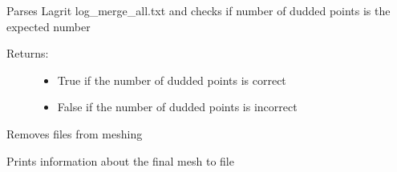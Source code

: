 \documentclass[letterpaper,10pt,english]{sphinxmanual}
\begin{document}
\begin{fulllineitems}
\label{pydfnworks:pydfnworks.mesh_dfn_helper.check_dudded_points}
Parses Lagrit log\_merge\_all.txt and checks if number of dudded points
is the expected number
\begin{description}
\item[{Returns: }] \leavevmode\begin{itemize}
\item {} 
True if the number of dudded points is correct

\item {} 
False if the number of dudded points is incorrect

\end{itemize}

\end{description}

\end{fulllineitems}


\begin{fulllineitems}
\label{pydfnworks:pydfnworks.mesh_dfn_helper.cleanup_dir}
Removes files from meshing

\end{fulllineitems}


\begin{fulllineitems}
\label{pydfnworks:pydfnworks.mesh_dfn_helper.output_meshing_report}
Prints information about the final mesh to file

\end{fulllineitems}

\end{document}
